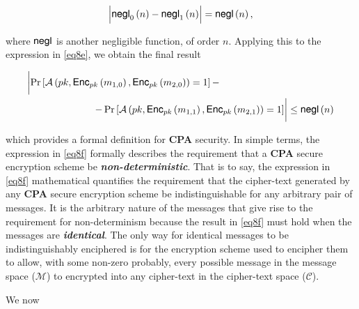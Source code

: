 \documentclass[../CryptoHW3.tex]{subfiles}
\begin{document}
\begin{flushleft}
\begin{align*}
  \Bigl| \text{{\fontfamily{phv}\selectfont negl}}_0 \left( n \right) - \text{{\fontfamily{phv}\selectfont negl}}_1 \left( n \right) \Bigr| = \text{{\fontfamily{phv}\selectfont negl}} \left( n \right),
\end{align*}

where $\text{{\fontfamily{phv}\selectfont negl}}$ is another negligible function, of order $n$.  Applying this to the expression in \ref{eq8e}, we obtain the final result

\begin{align}
  &\biggl| \Pr \left[ \mathcal{A} \left( pk,  \text{{\fontfamily{phv}\selectfont Enc}}_{pk} \left( m_{1, 0} \right), \text{{\fontfamily{phv}\selectfont Enc}}_{pk} \left( m_{2, 0} \right) \right) = 1 \right] - \biggr. \notag \\
  &\biggl. \qquad \qquad \qquad \quad - \Pr \left[ \mathcal{A} \left( pk,  \text{{\fontfamily{phv}\selectfont Enc}}_{pk} \left( m_{1, 1} \right), \text{{\fontfamily{phv}\selectfont Enc}}_{pk} \left( m_{2, 1} \right) \right) = 1 \right] \biggr| \leq \text{{\fontfamily{phv}\selectfont negl}} \left( n \right) \label{eq8f}
\end{align}

which provides a formal definition for \textbf{CPA} security.  In simple terms, the expression in \ref{eq8f} formally describes the requirement that a \textbf{CPA} secure encryption scheme be \textbf{\emph{non-deterministic}}. That is to say, the expression in \ref{eq8f} mathematical quantifies the requirement that the cipher-text generated by any \textbf{CPA} secure encryption scheme be indistinguishable for any arbitrary pair of messages.  It is the arbitrary nature of the messages that give rise to the requirement for non-determinism because the result in \ref{eq8f} must hold when the messages are \textbf{\emph{identical}}.  The only way for identical messages to be indistinguishably enciphered is for the encryption scheme used to encipher them to allow, with some non-zero probably, every possible message in the message space ($\mathcal{M}$) to encrypted into any cipher-text in the cipher-text space ($\mathcal{C}$). \newline


\vspace{0.10in}




We now 
























\end{flushleft}
\end{document}
